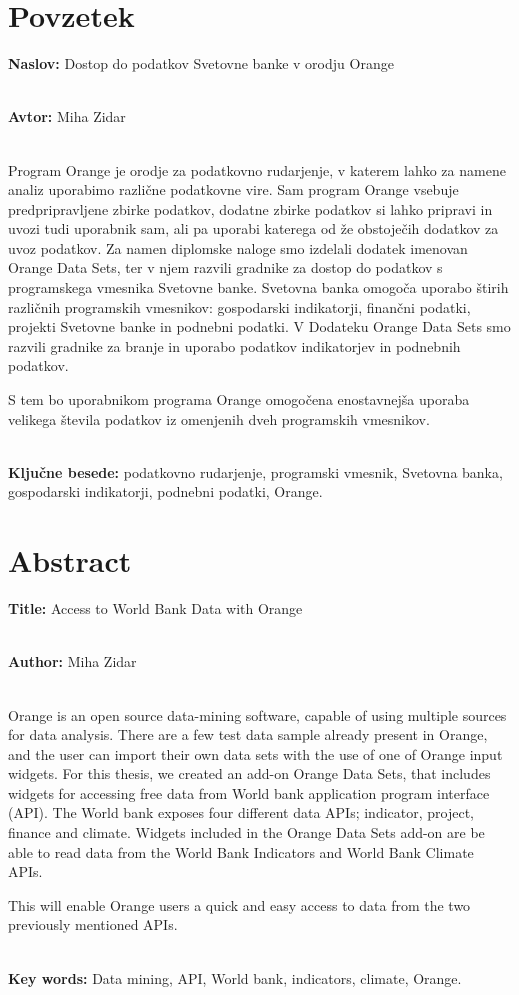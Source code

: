 \chapter*{Povzetek}


\textbf{Naslov:} Dostop do podatkov Svetovne banke v orodju Orange

\ \\
\textbf{Avtor:} Miha Zidar

\ \\
Program Orange je orodje za podatkovno rudarjenje, v katerem
lahko za namene analiz uporabimo različne podatkovne vire. Sam program Orange
vsebuje predpripravljene zbirke podatkov, dodatne zbirke podatkov si lahko 
pripravi in uvozi tudi uporabnik sam, ali pa uporabi katerega od že obstoječih
dodatkov za uvoz podatkov. Za namen diplomske naloge smo izdelali dodatek imenovan
Orange Data Sets, ter v njem razvili gradnike za dostop do podatkov s programskega 
vmesnika Svetovne banke. Svetovna banka omogoča uporabo štirih 
različnih programskih vmesnikov: gospodarski indikatorji, finančni podatki,
projekti Svetovne banke in podnebni podatki. V Dodateku Orange Data Sets smo
razvili gradnike za branje in uporabo podatkov indikatorjev 
in podnebnih podatkov.

S tem bo uporabnikom programa Orange omogočena enostavnejša uporaba velikega števila
podatkov iz omenjenih dveh programskih vmesnikov.

\ \\
\textbf{Ključne besede:} podatkovno rudarjenje, programski vmesnik, 
Svetovna banka, gospodarski indikatorji, podnebni podatki, Orange. 




\clearemptydoublepage

\chapter*{Abstract}


\textbf{Title:} Access to World Bank Data with Orange

\ \\
\textbf{Author:} Miha Zidar

\ \\
Orange is an open source data-mining software, capable of using multiple sources for data analysis. There are a few test data sample already present in Orange, and the user can import their own data sets with the use of one of Orange input widgets. For this thesis, we created an add-on Orange Data Sets, that includes widgets for accessing free data from World bank application program interface (API). The World bank exposes four different data APIs; indicator, project, finance and climate. Widgets included in the Orange Data Sets add-on are be able to read data from the World Bank Indicators and World Bank Climate APIs.

This will enable Orange users a quick and easy access to data from the two previously mentioned APIs.

\ \\
\textbf{Key words:} Data mining, API, World bank, indicators, climate, Orange.

